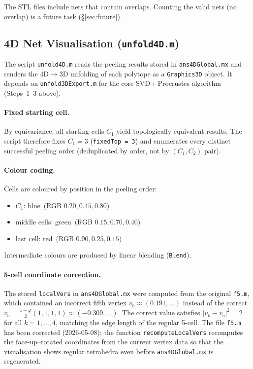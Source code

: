 \documentclass[12pt,a4paper]{article}
\theoremstyle{definition}
\begin{document}
\noindent
The STL files include nets that contain overlaps.
Counting the valid nets (no overlap) is a future task
(\S\ref{sec:future}).

\subsection{4D Net Visualisation (\texttt{unfold4D.m})}
\label{ssec:unfold4D}

The script \texttt{unfold4D.m} reads the peeling results stored in
\texttt{ans4DGlobal.mx} and renders the 4D$\to$3D unfolding of each
polytope as a \texttt{Graphics3D} object.
It depends on \texttt{unfold3DExport.m} for the core
SVD\,+\,Procrustes algorithm (Steps~1--3 above).

\paragraph{Fixed starting cell.}
By equivariance, all starting cells $C_1$ yield topologically
equivalent results.
The script therefore fixes $C_1 = 3$ (\texttt{fixedTop = 3}) and
enumerates every distinct successful peeling order
(deduplicated by order, not by $(C_1,C_2)$ pair).

\paragraph{Colour coding.}
Cells are coloured by position in the peeling order:
\begin{itemize}
  \item $C_1$: blue~(RGB $0.20, 0.45, 0.80$)
  \item middle cells: green~(RGB $0.15, 0.70, 0.40$)
  \item last cell: red~(RGB $0.90, 0.25, 0.15$)
\end{itemize}
Intermediate colours are produced by linear blending (\texttt{Blend}).

\paragraph{5-cell coordinate correction.}
The stored \texttt{localVers} in \texttt{ans4DGlobal.mx} were computed
from the original \texttt{f5.m}, which contained an incorrect fifth
vertex $v_5 \approx (0.191,\ldots)$ instead of the correct
$v_5 = \tfrac{1-\varphi}{2}(1,1,1,1) \approx (-0.309,\ldots)$.
The correct value satisfies $|v_k - v_5|^2 = 2$ for all $k=1,\ldots,4$,
matching the edge length of the regular 5-cell.
The file \texttt{f5.m} has been corrected (2026-05-08); the function
\texttt{recomputeLocalVers} recomputes the face-up--rotated coordinates
from the current vertex data so that the visualisation shows regular
tetrahedra even before \texttt{ans4DGlobal.mx} is regenerated.
\end{document}
